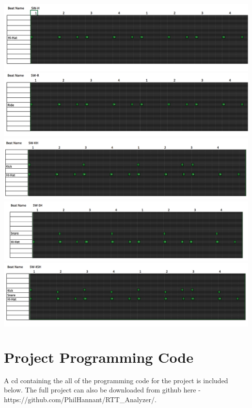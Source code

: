 \documentclass[a4paper, 11pt]{article}
\begin{document}
\begin{center}
\includegraphics[scale=0.25]{images/SW-H.jpg}\\
\includegraphics[scale=0.25]{images/SW-R.jpg}\\
\includegraphics[scale=0.25]{images/SW-KH.jpg}\\
\includegraphics[scale=0.25]{images/SW-SH.jpg}\\
\includegraphics[scale=0.25]{images/SW-KSH.jpg}\\
\end{center}
\clearpage


\section{Project Programming Code}
A cd containing the all of the programming code for the project is included below. The full project can also be downloaded from github here - https://github.com/PhilHannant/RTT\_Analyzer/.
\end{document}
